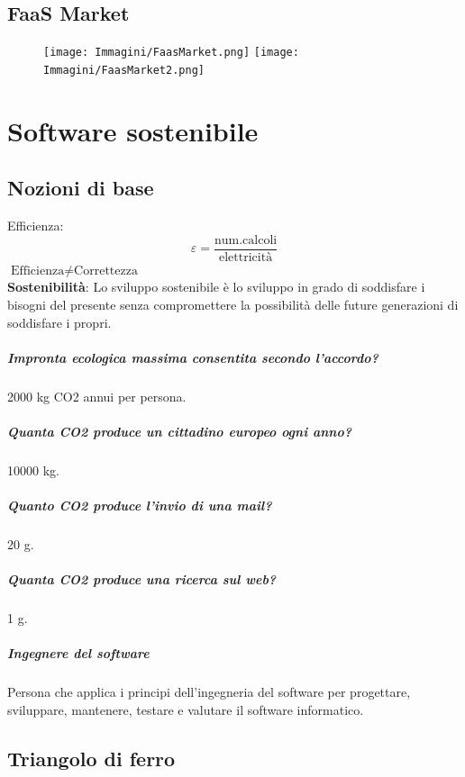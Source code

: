 \documentclass[a4paper, 12pt]{report}
\begin{document}
            \section{FaaS Market}
            \begin{figure}[htbp]
              \centering
              \texttt{[image: Immagini/FaasMarket.png]}
              \texttt{[image: Immagini/FaasMarket2.png]}
            \end{figure}
      \chapter{Software sostenibile}
          \section{Nozioni di base}
          Efficienza: $$\varepsilon = \frac{\text{num.calcoli}}{\text{elettricità}}$$
          $\text{Efficienza} \neq \text{Correttezza}$\\[5px]
          \textbf{Sostenibilità}: Lo sviluppo sostenibile è lo sviluppo in grado di soddisfare i bisogni
          del presente senza compromettere la possibilità delle future
          generazioni di soddisfare i propri.
          \paragraph{Impronta ecologica massima consentita secondo l’accordo?} 2000 kg CO2 annui per persona.
          \paragraph{Quanta CO2 produce un cittadino europeo ogni anno?} 10000 kg.
          \paragraph{Quanto CO2 produce l’invio di una mail?} 20 g.
          \paragraph{Quanta CO2 produce una ricerca sul web?} 1 g.
          \paragraph{Ingegnere del software} Persona che applica i principi dell'ingegneria del software per progettare, sviluppare, mantenere,
          testare e valutare il software informatico.
          \section{Triangolo di ferro}
\end{document}
